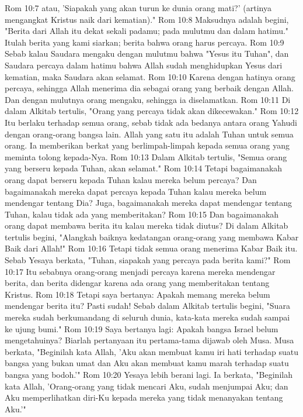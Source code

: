 Rom 10:7  atau, 'Siapakah yang akan turun ke dunia orang mati?' (artinya mengangkat Kristus naik dari kematian)."
Rom 10:8  Maksudnya adalah begini, "Berita dari Allah itu dekat sekali padamu; pada mulutmu dan dalam hatimu." Itulah berita yang kami siarkan; berita bahwa orang harus percaya.
Rom 10:9  Sebab kalau Saudara mengaku dengan mulutmu bahwa "Yesus itu Tuhan", dan Saudara percaya dalam hatimu bahwa Allah sudah menghidupkan Yesus dari kematian, maka Saudara akan selamat.
Rom 10:10  Karena dengan hatinya orang percaya, sehingga Allah menerima dia sebagai orang yang berbaik dengan Allah. Dan dengan mulutnya orang mengaku, sehingga ia diselamatkan.
Rom 10:11  Di dalam Alkitab tertulis, "Orang yang percaya tidak akan dikecewakan."
Rom 10:12  Itu berlaku terhadap semua orang, sebab tidak ada bedanya antara orang Yahudi dengan orang-orang bangsa lain. Allah yang satu itu adalah Tuhan untuk semua orang. Ia memberikan berkat yang berlimpah-limpah kepada semua orang yang meminta tolong kepada-Nya.
Rom 10:13  Dalam Alkitab tertulis, "Semua orang yang berseru kepada Tuhan, akan selamat."
Rom 10:14  Tetapi bagaimanakah orang dapat berseru kepada Tuhan kalau mereka belum percaya? Dan bagaimanakah mereka dapat percaya kepada Tuhan kalau mereka belum mendengar tentang Dia? Juga, bagaimanakah mereka dapat mendengar tentang Tuhan, kalau tidak ada yang memberitakan?
Rom 10:15  Dan bagaimanakah orang dapat membawa berita itu kalau mereka tidak diutus? Di dalam Alkitab tertulis begini, "Alangkah baiknya kedatangan orang-orang yang membawa Kabar Baik dari Allah!"
Rom 10:16  Tetapi tidak semua orang menerima Kabar Baik itu. Sebab Yesaya berkata, "Tuhan, siapakah yang percaya pada berita kami?"
Rom 10:17  Itu sebabnya orang-orang menjadi percaya karena mereka mendengar berita, dan berita didengar karena ada orang yang memberitakan tentang Kristus.
Rom 10:18  Tetapi saya bertanya: Apakah memang mereka belum mendengar berita itu? Pasti sudah! Sebab dalam Alkitab tertulis begini, "Suara mereka sudah berkumandang di seluruh dunia, kata-kata mereka sudah sampai ke ujung bumi."
Rom 10:19  Saya bertanya lagi: Apakah bangsa Israel belum mengetahuinya? Biarlah pertanyaan itu pertama-tama dijawab oleh Musa. Musa berkata, "Beginilah kata Allah, 'Aku akan membuat kamu iri hati terhadap suatu bangsa yang bukan umat dan Aku akan membuat kamu marah terhadap suatu bangsa yang bodoh.'"
Rom 10:20  Yesaya lebih berani lagi. Ia berkata, "Beginilah kata Allah, 'Orang-orang yang tidak mencari Aku, sudah menjumpai Aku; dan Aku memperlihatkan diri-Ku kepada mereka yang tidak menanyakan tentang Aku.'"
